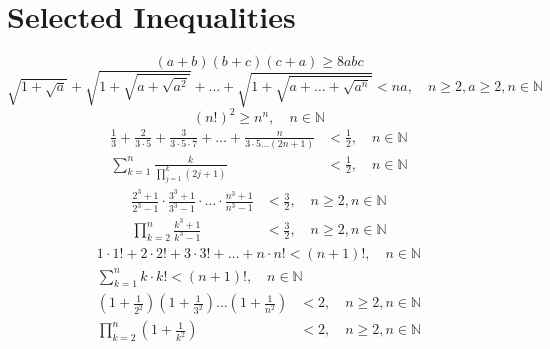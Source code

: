 \documentclass[a4paper,11pt]{article}
\begin{document}
\section{Selected Inequalities}
\begin{equation}
    (a+b)(b+c)(c+a) \geq 8abc
\end{equation}
\vspace{13pt}
\begin{equation}
    \sqrt{1+\sqrt{a}} + \sqrt{1+\sqrt{a + \sqrt{a^2}}} + \ldots + \sqrt{1+\sqrt{a + \ldots +\sqrt{a^n}}} < na, \quad n\geq2, a\geq2, n\in\mathbb{N}
\end{equation}
\vspace{13pt}
\begin{equation}
    (n!)^2 \geq n^n, \quad n\in\mathbb{N}
\end{equation}
\vspace{13pt}
\begin{equation}
    \begin{aligned}
        \frac{1}{3} + \frac{2}{3\cdot5} + \frac{3}{3\cdot5\cdot7} + \ldots + \frac{n}{3\cdot5\dots(2n+1)} &< \frac{1}{2}, \quad n\in\mathbb{N} \\
        \sum_{k=1}^n \frac{k}{\prod_{j=1}^k (2j+1)} &< \frac{1}{2}, \quad n\in\mathbb{N}
    \end{aligned}
\end{equation}
\vspace{13pt}
\begin{equation}
    \begin{aligned}
        \frac{2^3+1}{2^3-1} \cdot \frac{3^3+1}{3^3-1} \cdot\ldots\cdot \frac{n^3+1}{n^3-1}&<\frac{3}{2}, \quad n\geq2,n\in\mathbb{N} \\
        \prod_{k=2}^n \frac{k^3+1}{k^3-1} &< \frac{3}{2}, \quad n\geq2,n\in\mathbb{N}
    \end{aligned}
\end{equation}
\vspace{13pt}
\begin{equation}
    \begin{aligned}
        1\cdot1! + 2\cdot2! + 3\cdot3! + \ldots + n\cdot n! < (n+1)!, \quad n\in\mathbb{N} \\
        \sum_{k=1}^n k\cdot k! < (n+1)!, \quad n\in\mathbb{N}
    \end{aligned}
\end{equation}
\vspace{13pt}
\begin{equation}
    \begin{aligned}
        \left(1+\frac{1}{2^2}\right)\left(1+\frac{1}{3^2}\right)\dots\left(1+\frac{1}{n^2}\right) &< 2, \quad n\geq2, n\in\mathbb{N} \\
        \prod_{k=2}^n \left(1+\frac{1}{k^2}\right) &< 2, \quad n\geq2, n\in\mathbb{N}
    \end{aligned}
\end{equation}
\end{document}
